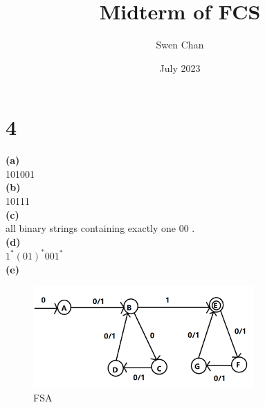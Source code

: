 \documentclass{article}
\title{Midterm of FCS}
\author{Swen Chan}
\date{July 2023}
\begin{document}
\maketitle

\section*{4}
\textbf{(a)}\\
101001\\
\textbf{(b)}\\
10111\\
\textbf{(c)}\\
all binary strings containing exactly one \(00\) .\\
\textbf{(d)}\\
\(1^*(01)^*001^*\)\\
\textbf{(e)}\\
\begin{figure}[h]
    \centering
    \includegraphics[width=0.75\textwidth]{Q4ofFCS}
    \caption{FSA}
    \label{fig:1}
\end{figure}
\end{document}
